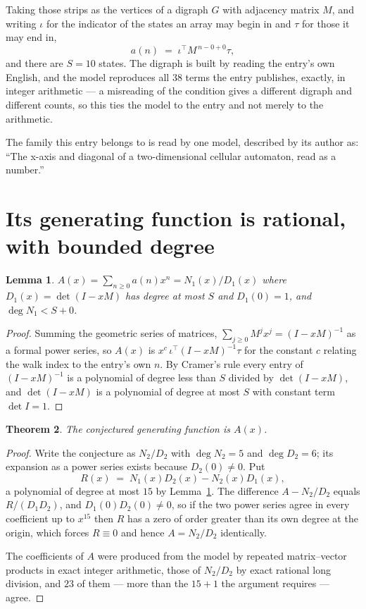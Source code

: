 \documentclass[11pt,a4paper]{article}
\theoremstyle{plain}
\newtheorem{theorem}{Theorem}
\newtheorem{lemma}[theorem]{Lemma}
\theoremstyle{definition}
\begin{document}
Taking those strips as the vertices of a digraph $G$ with adjacency matrix $M$, and writing
$\iota$ for the indicator of the states an array may begin in and $\tau$ for those it may end
in,
\[
a(n)\;=\;\iota^{\!\top}M^{\,n-0+0}\tau ,
\]
and there are $S=10$ states. The digraph is built by reading the entry's own English, and the
model reproduces all $38$ terms the entry publishes, exactly, in integer arithmetic --- a
misreading of the condition gives a different digraph and different counts, so this ties the
model to the entry and not merely to the arithmetic.

The family this entry belongs to is read by one model, described by its author as: ``The x-axis and diagonal of a two-dimensional cellular automaton, read as a number.''


\section{Its generating function is rational, with bounded degree}

\begin{lemma}\label{lem:rat}
$A(x)=\sum_{n\ge0}a(n)x^n=N_1(x)/D_1(x)$ where $D_1(x)=\det(I-xM)$ has degree at most
$S$ and $D_1(0)=1$, and $\deg N_1<S+0$.
\end{lemma}

\begin{proof}
Summing the geometric series of matrices, $\sum_{j\ge0}M^jx^j=(I-xM)^{-1}$ as a formal
power series, so $A(x)$ is $x^{c}\,\iota^{\!\top}(I-xM)^{-1}\tau$ for the constant $c$
relating the walk index to the entry's own $n$. By Cramer's rule every entry of
$(I-xM)^{-1}$ is a polynomial of degree less than $S$ divided by $\det(I-xM)$, and
$\det(I-xM)$ is a polynomial of degree at most $S$ with constant term $\det I=1$.
\end{proof}

\begin{theorem}
The conjectured generating function is $A(x)$.
\end{theorem}

\begin{proof}
Write the conjecture as $N_2/D_2$ with $\deg N_2=5$ and $\deg D_2=6$; its expansion as a
power series exists because $D_2(0)\neq0$. Put
\[
R(x)\;=\;N_1(x)D_2(x)-N_2(x)D_1(x),
\]
a polynomial of degree at most $15$ by Lemma~\ref{lem:rat}. The difference
$A-N_2/D_2$ equals $R/(D_1D_2)$, and $D_1(0)D_2(0)\neq0$, so if the two power series agree in
every coefficient up to $x^{15}$ then $R$ has a zero of order greater than its own
degree at the origin, which forces $R\equiv0$ and hence $A=N_2/D_2$ identically.

The coefficients of $A$ were produced from the model by repeated matrix--vector products in
exact integer arithmetic, those of $N_2/D_2$ by exact rational long division, and $23$
of them --- more than the $15+1$ the argument requires --- agree.
\end{proof}
\end{document}
